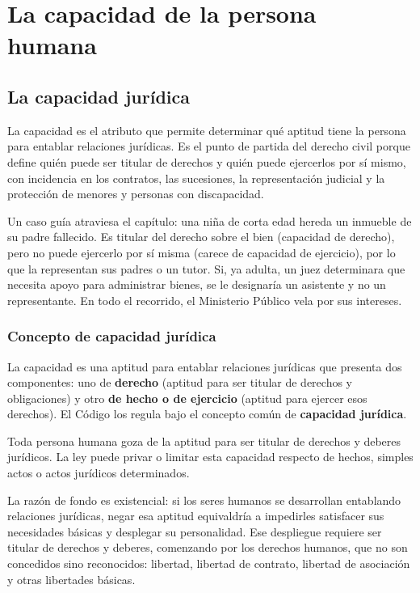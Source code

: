 \documentclass[12pt,oneside]{book}
\begin{document}
\part{La capacidad de la persona humana}

\chapter{La capacidad jurídica}
\label{cap:capacidad}

La capacidad es el atributo que permite determinar qué aptitud tiene la persona para entablar relaciones jurídicas. Es el punto de partida del derecho civil porque define quién puede ser titular de derechos y quién puede ejercerlos por sí mismo, con incidencia en los contratos, las sucesiones, la representación judicial y la protección de menores y personas con discapacidad.

Un caso guía atraviesa el capítulo: una niña de corta edad hereda un inmueble de su padre fallecido. Es titular del derecho sobre el bien (capacidad de derecho), pero no puede ejercerlo por sí misma (carece de capacidad de ejercicio), por lo que la representan sus padres o un tutor. Si, ya adulta, un juez determinara que necesita apoyo para administrar bienes, se le designaría un asistente y no un representante. En todo el recorrido, el Ministerio Público vela por sus intereses.

\section{Concepto de capacidad jurídica}

La capacidad es una aptitud para entablar relaciones jurídicas que presenta dos componentes: uno de \textbf{derecho} (aptitud para ser titular de derechos y obligaciones) y otro \textbf{de hecho o de ejercicio} (aptitud para ejercer esos derechos). El Código los regula bajo el concepto común de \textbf{capacidad jurídica}.

\begin{regla}
Toda persona humana goza de la aptitud para ser titular de derechos y deberes jurídicos. La ley puede privar o limitar esta capacidad respecto de hechos, simples actos o actos jurídicos determinados.
\end{regla}

La razón de fondo es existencial: si los seres humanos se desarrollan entablando relaciones jurídicas, negar esa aptitud equivaldría a impedirles satisfacer sus necesidades básicas y desplegar su personalidad. Ese despliegue requiere ser titular de derechos y deberes, comenzando por los derechos humanos, que no son concedidos sino reconocidos: libertad, libertad de contrato, libertad de asociación y otras libertades básicas.
\end{document}
